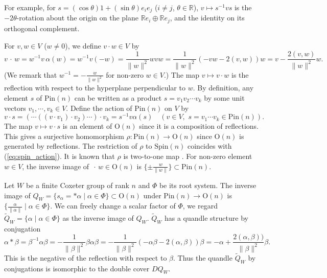 \documentclass{amsart}
\theoremstyle{definition}
\theoremstyle{remark}
\numberwithin{equation}{section}
\begin{document}
For example, for $s = (\cos \theta) 1 + (\sin \theta) e_i e_j$ 
($i \neq j$, $\theta \in \mathbb{R}$), 
$v \mapsto s^{-1} v s$ is the $-2 \theta$-rotation about the origin
on the plane $\mathbb{R}e_i \oplus \mathbb{R} e_j$, 
and the identity on its orthogonal complement.

For $v, w \in V$ ($w \neq 0$), we define $v \cdot w \in V$ by
\[
v \, \cdot \, w = w^{-1} v \, \alpha(w) = w^{-1} v (-w) 
= \frac{1}{\| w \|^2} w v w
= \frac{1}{\| w \|^2} (-v w - 2 (v,w)) w
= v - \frac{2 (v,w)}{\| w \|^2} w.
\]
(We remark that $w^{-1} = -\frac{w}{\|w\|^2}$ for non-zero $w \in V$.)
The map $v \mapsto v \cdot w$ is the reflection with respect to 
the hyperplane perpendicular to $w$.
By definition, any element $s$ of $\mathrm{Pin}(n)$ can be written as 
a product $s = v_1 v_2 \cdots v_k$ by some unit vectors $v_1, \cdots , v_k \in V$.
Define the action of $\mathrm{Pin}(n)$ on $V$ by
\[
v \cdot s = ( \cdots ( (v \cdot v_1) \cdot v_2)  \cdots ) \cdot v_k 
= s^{-1} v \alpha(s)
\quad (v \in V, \,\, s = v_1 \cdots v_k \in \mathrm{Pin}(n)).
\]
The map $v \mapsto v \cdot s$ is an element of $\mathrm{O}(n)$
since it is a composition of reflections. 
This gives a surjective homomorphism $\rho : \mathrm{Pin}(n) \to \mathrm{O}(n)$
since $\mathrm{O}(n)$ is generated by reflections.
The restriction of $\rho$ to $\mathrm{Spin}(n)$ coincides with (\ref{eq:spin_action}).
It is known that $\rho$ is two-to-one map \cite[p. 19]{LawsonMichelsohn}.
For non-zero element $w \in V$, the inverse image of 
$ \, \cdot \, w \in \mathrm{O}(n)$ is 
$\{ \pm \frac{w}{\| w \|} \} \subset \mathrm{Pin}(n)$.


Let $W$ be a finite Coxeter group of rank $n$ and $\Phi$ be its root system.
The inverse image of 
$Q_{W} = \{ s_{\alpha} = *\alpha \mid \alpha \in \Phi \}\subset \mathrm{O}(n)$
under $\mathrm{Pin}(n) \to \mathrm{O}(n)$ 
is $\{ \frac{\alpha}{\| \alpha \|} \mid  \alpha \in \Phi \}$.
We can freely change a scalar factor of $\Phi$, we regard 
$\widetilde{Q}_W = \{ \alpha  \mid  \alpha \in \Phi \}$
as the inverse image of $Q_W$.
$\widetilde{Q}_W$ has a quandle structure by conjugation
\[
\alpha * \beta = \beta^{-1} \alpha \beta
= - \frac{1}{\| \beta \|^2} \beta \alpha \beta
= - \frac{1}{\| \beta \|^2} (-\alpha \beta - 2 (\alpha, \beta))\beta
= -\alpha + \frac{2 (\alpha, \beta))}{\| \beta \|^2} \beta.
\]
This is the negative of the reflection with respect to $\beta$.
Thus the quandle $\widetilde{Q}_W$ by conjugations is isomorphic 
to the double cover $DQ_W$.
\end{document}
